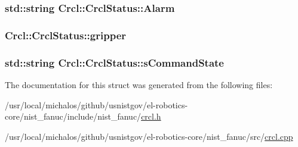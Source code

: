 \hypertarget{structCrcl_1_1CrclStatus_a0cd3ee396ed753479bd03ec30809db22}{
\subsubsection[{Alarm}]{\setlength{\rightskip}{0pt plus 5cm}std\-::string Crcl\-::\-Crcl\-Status\-::\-Alarm}}\label{structCrcl_1_1CrclStatus_a0cd3ee396ed753479bd03ec30809db22}
\hypertarget{structCrcl_1_1CrclStatus_add19fb6e10e25182b651f0dc2dbacd8a}{
\subsubsection[{gripper}]{ Crcl\-::\-Crcl\-Status\-::gripper}}\label{structCrcl_1_1CrclStatus_add19fb6e10e25182b651f0dc2dbacd8a}
\hypertarget{structCrcl_1_1CrclStatus_af485e1524d7eb0f8108fabeb9ae371f8}{
\subsubsection[{s\-Command\-State}]{\setlength{\rightskip}{0pt plus 5cm}std\-::string Crcl\-::\-Crcl\-Status\-::s\-Command\-State}}\label{structCrcl_1_1CrclStatus_af485e1524d7eb0f8108fabeb9ae371f8}


The documentation for this struct was generated from the following files\-:\begin{DoxyCompactItemize}
\item 
/usr/local/michalos/github/usnistgov/el-\/robotics-\/core/nist\-\_\-fanuc/include/nist\-\_\-fanuc/\hyperlink{crcl_8h}{crcl.\-h}\item 
/usr/local/michalos/github/usnistgov/el-\/robotics-\/core/nist\-\_\-fanuc/src/\hyperlink{crcl_8cpp}{crcl.\-cpp}\end{DoxyCompactItemize}
